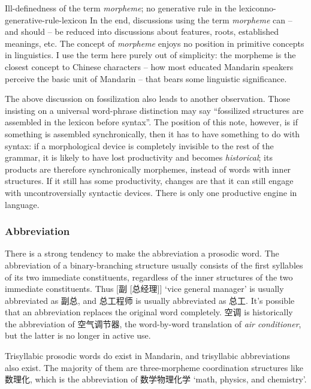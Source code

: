 \documentclass[UTF8, a4paper, oneside, scheme=plain, 12pt]{ctexrep}
\newcommand*{\term}[1]{\emph{#1}}
\newcommand{\form}[1]{\emph{#1}}
\newcommand{\translate}[1]{`#1'}
\begin{document}
\begin{theorybox}{Ill-definedness of the term \term{morpheme}; no generative rule in the lexicon}{no-generative-rule-lexicon}
    In the end, discussions using the term \term{morpheme} can -- and should -- 
    be reduced into discussions about features, roots, established meanings, etc.
    The concept of \term{morpheme} enjoys no position 
    in primitive concepts in linguistics.
    I use the term here purely out of simplicity:
    the morpheme is the closest concept to Chinese characters 
    -- how most educated Mandarin speakers perceive the basic unit of Mandarin
    -- that bears some linguistic significance.

    The above discussion on fossilization also leads to another observation.
    Those insisting on a universal word-phrase distinction 
    may say ``fossilized structures are assembled in the lexicon before syntax''.
    The position of this note, however, is if something is assembled synchronically,
    then it has to have something to do with syntax:
    if a morphological device is completely invisible to the rest of the grammar,
    it is likely to have lost productivity and becomes \emph{historical}; 
    its products are therefore synchronically morphemes, 
    instead of words with inner structures.
    If it still has some productivity,
    changes are that it can still engage with uncontroversially syntactic devices.
    There is only one productive engine in language. 
\end{theorybox}

\subsubsection{Abbreviation}\label{sec:pos.morpheme.abbreviation}

There is a strong tendency to make the abbreviation a prosodic word.
The abbreviation of a binary-branching structure
usually consists of the first syllables of its two immediate constituents,
regardless of the inner structures of the two immediate constituents.
Thus [副 [总经理]] \translate{vice general manager} is usually abbreviated as 副总, 
and 总工程师 is usually abbreviated as 总工.
It's possible that an abbreviation replaces the original word completely.
空调 is historically the abbreviation of 空气调节器, 
the word-by-word translation of \form{air conditioner},
but the latter is no longer in active use.

Trisyllabic prosodic words do exist in Mandarin, 
and trisyllabic abbreviations also exist.
The majority of them are three-morpheme coordination structures like 数理化, 
which is the abbreviation of 
数学物理化学 \translate{math, physics, and chemistry}.
\end{document}
